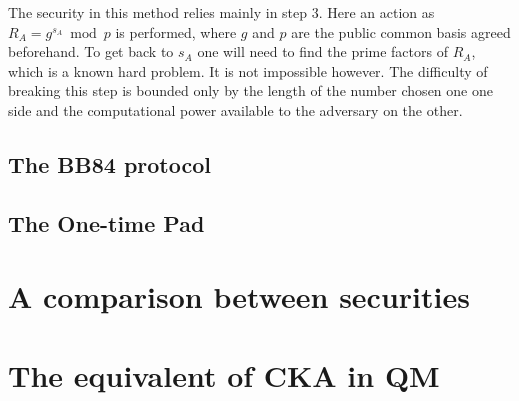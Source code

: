 	The security in this method relies mainly in step 3. Here an action as $ R_A = g^{s_A} \bmod p $ is performed, where $g$ and $p$ are the public common basis agreed beforehand. 
	To get back to $s_A$  one will need to find the prime factors of $R_A$, which is a known hard problem. It is not impossible however. The difficulty of breaking this step is bounded only by the length of the number chosen one one side and the computational power available to the adversary on the other.
	\subsection{The BB84 protocol}
		
	\subsection{The One-time Pad}
		
\section{A comparison between securities}
\section{The equivalent of CKA in QM}
